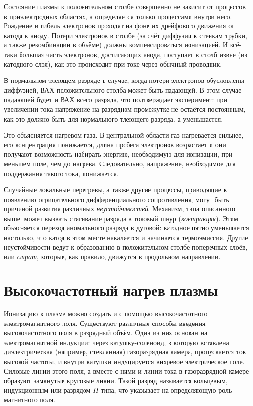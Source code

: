 Состояние плазмы в положительном столбе совершенно не зависит от процессов в приэлектродных областях, а определяется
только процессами внутри него. Рождение и гибель электронов проходят на фоне их дрейфового движения от катода к аноду.
Потери электронов в столбе (за счёт диффузии к стенкам трубки, а также рекомбинации в объёме) должны компенсироваться
ионизацией. И всё-таки большая часть электронов, достигающих анода, поступает в столб извне (из катодного слоя), как это
происходит при токе через обычный проводник.

В нормальном тлеющем разряде в случае, когда потери электронов обусловлены диффузией, ВАХ положительного столба может
быть падающей. В этом случае падающей будет и ВАХ всего разряда, что подтверждает эксперимент: при увеличении тока
напряжение на разрядном промежутке не остаётся постоянным, как это должно быть для нормального тлеющего разряда, а
уменьшается.

Это объясняется нагревом газа. В центральной области газ нагревается сильнее, его концентрация понижается, длина пробега
электронов возрастает и они получают возможность набирать энергию, необходимую для ионизации, при меньшем поле, чем до
нагрева. Следовательно, напряжение, необходимое для поддержания такого тока, понижается.

Случайные локальные перегревы, а также другие процессы, приводящие к появлению отрицательного дифференциального
сопротивления, могут быть причиной развития различных \textit{неустойчивостей}. Механизм, типа описанного выше, может
вызвать стягивание разряда в токовый шнур (\textit{контракция}). Этим объясняется переход аномального разряда в дуговой:
катодное пятно уменьшается настолько, что катод в этом месте накаляется и начинается термоэмиссия. Другие неустойчивости
ведут к образованию в положительном столбе поперечных слоёв, или \textit{страт}, которые, как правило, движутся в
продольном направлении.

\section{Высокочастотный нагрев плазмы}

Ионизацию в плазме можно создать и с помощью высокочастотного электромагнитного поля. Существуют различные способы
введения высокочастотного поля в разрядный объём. Один из них основан на электромагнитной индукции: через
катушку-соленоид, в которую вставлена диэлектрическая (например, стеклянная) газоразрядная камера, пропускается ток
высокой частоты, и внутри катушки индуцируется вихревое электрическое поле. Силовые линии этого поля, а вместе с ними и
линии тока в газоразрядной камере образуют замкнутые круговые линии. Такой разряд называется кольцевым, индукционным или
разрядом $H$-типа, что указывает на определяющую роль магнитного поля.

